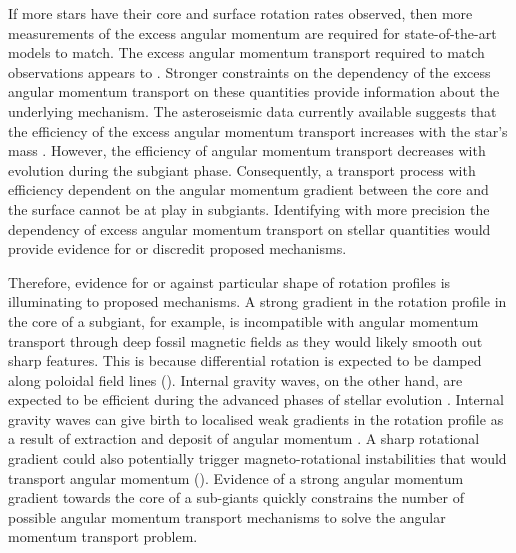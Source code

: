 If more stars have their core and surface rotation rates observed, then more measurements of the excess angular momentum are required for state-of-the-art models to match.
The excess angular momentum transport required to match observations appears to .
Stronger constraints on the dependency of the excess angular momentum transport on these quantities provide information about the underlying mechanism.
The \kepler{} asteroseismic data currently available suggests that the efficiency of the excess angular momentum transport increases with the star's mass \citep{eggenberger_asteroseismology_2019}.
However, the efficiency of angular momentum transport decreases with evolution during the subgiant phase.
Consequently, a transport process with efficiency dependent on the angular momentum gradient between the core and the surface cannot be at play in subgiants.
Identifying with more precision the dependency of excess angular momentum transport on stellar quantities would provide evidence for or discredit proposed mechanisms.

Therefore, evidence for or against particular shape of rotation profiles is illuminating to proposed mechanisms.
A strong gradient in the rotation profile in the core of a subgiant, for example, is incompatible with angular momentum transport through deep fossil magnetic fields \citep{gough_effect_1990} as they would likely smooth out sharp features.
 This is because differential rotation is expected to be damped along poloidal field lines (\citealp{garaud_rotationally_2002, strugarek_magnetic_2011}).
 Internal gravity waves, on the other hand, are expected to be efficient during the advanced phases of stellar evolution \citep{charbonnel_deep_2008}. 
Internal gravity waves can give birth to localised weak gradients in the rotation profile as a result of extraction and deposit of angular momentum \citep{charbonnel_influence_2005}. 
A sharp rotational gradient could also potentially trigger magneto-rotational instabilities that would transport angular momentum (\citealp{balbus_stability_1994,arlt_differential_2003,menou_magnetorotational_2006, fuller_asteroseismology_2015, fuller_slowing_2019,moyano_asteroseismology_2022}). 
Evidence of a strong angular momentum gradient towards the core of a sub-giants quickly constrains the number of possible angular momentum transport mechanisms to solve the angular momentum transport problem.

